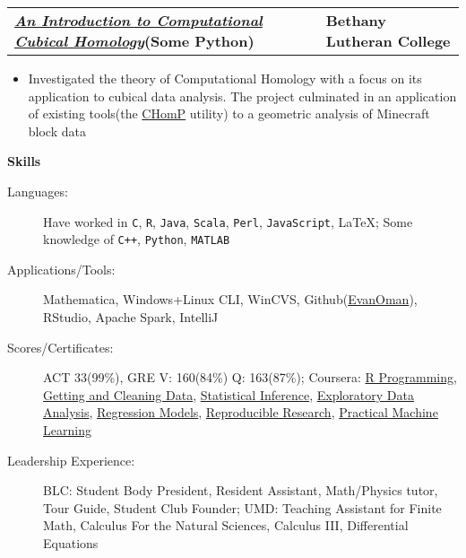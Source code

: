 \documentclass[letterpaper,10pt]{article}
\newcommand{\resitem}[1]{\item #1 

\vspace{-.1in}
}
\newcommand{\resheading}[1]{
	{
		\large\colorbox{mygrey}
		{
			\begin{minipage}{.98\textwidth}

			\centerline{\textbf{#1 \vphantom{p\^{E}}}}
\end{minipage}
}}
}
\newcommand{\ressubheadingg}[2]{
\begin{tabular*}{7.6in}{L{5.25in}R{2.4in}}
		\textbf{#1} & \textbf{#2}
\end{tabular*}}
\begin{document}
\vspace{.1in}
\ressubheadingg{\href{https://drive.google.com/file/d/0B5IOv9SzzDlvdnowZVpKRzhXOU0/edit?usp=sharing}{\textit{An Introduction to Computational Cubical Homology}}(Some Python)}{Bethany Lutheran College}
\vspace{-.1in}
\begin{itemize}

\vspace{-.15in}
	\resitem{Investigated the theory of Computational Homology with a focus on its application to cubical data analysis. The project culminated in an application of existing tools(the \href{http://chomp.rutgers.edu/}{CHomP} utility) to a geometric analysis of Minecraft block data}
\end{itemize}
\vspace{.1in}

\resheading{Skills}
\begin{description}
\item[Languages:]
Have worked in \verb!C!, \verb!R!, \verb!Java!, \verb!Scala!, \verb!Perl!, \verb!JavaScript!, \LaTeX; Some knowledge of \verb!C++!, \verb!Python!, \verb!MATLAB!
\item[Applications/Tools:]
Mathematica, Windows+Linux CLI, WinCVS, Github(\href{https://www.github.com/EvanOman}{EvanOman}), RStudio, Apache Spark, IntelliJ

\item[Scores/Certificates:]
ACT 33(99\%), GRE V: 160(84\%) Q: 163(87\%); Coursera: \href{https://www.coursera.org/account/accomplishments/records/cxq3vN5HB76be56t}{R Programming}, \href{https://www.coursera.org/account/accomplishments/records/Xt3sCA24Qz3Par7M}{Getting and Cleaning Data}, \href{https://www.coursera.org/account/accomplishments/records/yPex7nURcXCYdsse}{Statistical Inference}, \href{https://www.coursera.org/account/accomplishments/records/XMkgJcmHPGtNBXsU}{Exploratory Data Analysis}, \href{https://www.coursera.org/account/accomplishments/records/Qx8qaDCvw9ZNQtqP}{Regression Models}, \href{https://www.coursera.org/account/accomplishments/records/g5LfcvAD5rJuEnGX}{Reproducible Research},
\href{https://www.coursera.org/account/accomplishments/verify/ZNTJVMJKSH}{Practical Machine Learning}

\item[Leadership Experience:] BLC: Student Body President, Resident Assistant, Math/Physics tutor, Tour Guide, Student Club Founder; UMD: Teaching Assistant for Finite Math, Calculus For the Natural Sciences, Calculus III, Differential Equations
\end{description}
\end{document}
